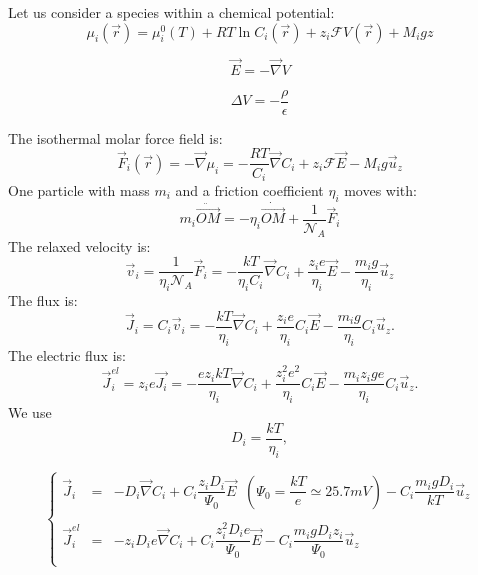 \documentclass[aps,12pt]{revtex4}
\newcommand{\grad}{\vec{\nabla}}
\begin{document}
Let us consider a species within a chemical potential:
\begin{equation}
	\mu_i(\vec{r}) = \mu_i^0(T) + RT \ln C_i(\vec{r}) +  z_i \mathcal{F} V(\vec{r}) + M_i g z
\end{equation}

\begin{equation}
	\vec{E} = -\grad V
\end{equation}

\begin{equation}
	\Delta V = -\dfrac{\rho}{\epsilon}
\end{equation}

The isothermal molar force field is:
\begin{equation}
	\vec{F}_i(\vec{r}) = -\grad \mu_{i} = -\frac{RT}{C_i} \grad C_i + z_i \mathcal{F} \vec{E} - M_i g \vec{u}_z
\end{equation}
One particle with mass $m_i$ and a friction coefficient $\eta_i$ moves with:
\begin{equation}
	m_i  \ddot{\vec{OM}} = -\eta_i  \dot{\vec{OM}} + \dfrac{1}{\mathcal{N}_A} \vec{F}_i
\end{equation}
The relaxed velocity is:
\begin{equation}
	\vec{v}_i = \dfrac{1}{\eta_i\mathcal{N}_A} \vec{F}_i = -\dfrac{kT}{\eta_i C_i} \grad C_i + \frac{z_i e}{\eta_i} \vec{E} - \dfrac{m_ig}{\eta_i} \vec{u}_z
\end{equation}
The flux is:
\begin{equation}
	\vec{J}_i = C_i \vec{v}_i = -\dfrac{kT}{\eta_i} \grad C_i + \dfrac{z_i e}{\eta_i} C_i \vec{E} - \dfrac{m_ig}{\eta_i} C_i \vec{u}_z.
\end{equation}
The electric flux is:
\begin{equation}
	\vec{J}^{el}_i = z_i e \vec{J_i} = -\dfrac{ez_ikT}{\eta_i} \grad C_i + \dfrac{z_i^2 e^2}{\eta_i} C_i \vec{E}- \dfrac{m_iz_ige}{\eta_i} C_i \vec{u}_z.
\end{equation}
We use
\begin{equation}
	D_i = \dfrac{kT}{\eta_i}, 
\end{equation}

\begin{equation}
\left\lbrace
\begin{array}{rcl}
\vec{J}_i & = &  -D_i \grad C_i + C_i \dfrac{z_i D_i}{\Psi_0}  \vec{E} \;\; (\Psi_0=\dfrac{kT}{e}\simeq 25.7 mV) - C_i \dfrac{m_ig D_i}{kT} \vec{u}_z\\
\\
\vec{J}^{el}_i & = & - z_i D_i e  \grad C_i + C_i \dfrac{z_i^2 D_i e}{\Psi_0}  \vec{E} - C_i \dfrac{m_ig D_i z_i  }{\Psi_0} \vec{u}_z \\
\end{array}
\right.
\end{equation}
\end{document}
